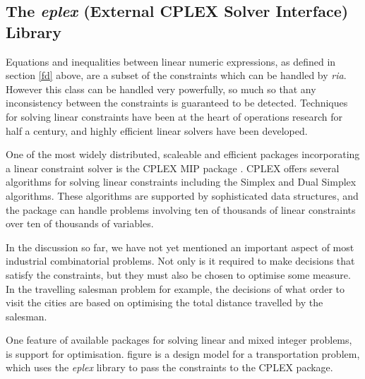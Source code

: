 \documentclass[a4wide]{article}
\begin{document}
\subsection{The {\em eplex} (External CPLEX Solver Interface) Library}
\label{eplex}
Equations and inequalities between linear numeric expressions, as
defined in section \ref{fd} above, are a
subset of the constraints which can be handled by {\em ria}.
However this class can be handled very powerfully, so much so that any
inconsistency between the constraints is guaranteed to be detected.
Techniques for solving linear constraints have been at the heart of
operations research for half a century, and highly efficient linear
solvers have been developed.

One of the most widely distributed, scaleable and efficient packages
incorporating a linear constraint solver is the CPLEX MIP package
\cite{CPLEX}. 
CPLEX offers several algorithms for solving linear constraints
including the Simplex and Dual Simplex algorithms.
These algorithms are supported by sophisticated data structures, and
the package can handle problems involving ten of thousands of linear
constraints over ten of thousands of variables. 

In the discussion so far, we have not yet mentioned an important
aspect of most industrial combinatorial problems.
Not only is it required to make decisions that satisfy the
constraints, but they must also be chosen to optimise some measure.
In the travelling salesman problem for example, the decisions of what
order to visit the cities are based on optimising the total distance
travelled by the salesman.

One feature of available packages for solving linear and mixed integer
problems, is support for optimisation.
figure \pageref{transportation} is a design model for a transportation
problem, which uses the {\em eplex} library to pass the constraints
to the CPLEX package.
\end{document}

